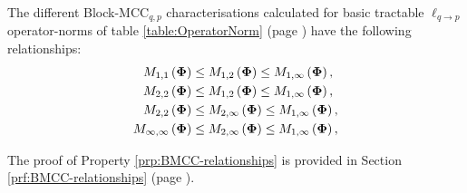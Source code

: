 \begin{property}
\label{prp:BMCC-relationships}
The different Block-MCC$_{q,p}$ characterisations calculated for basic tractable $\ell_{q {\to} p}$ operator-norms of table \ref{table:OperatorNorm} (page \pageref{table:OperatorNorm}) have the following relationships:
\begin{equation*}
\begin{aligned}
M_{1,1}\left( \boldsymbol{\Phi} \right) &\leq M_{1,2}\left( \boldsymbol{\Phi} \right) \leq M_{1,\infty}\left( \boldsymbol{\Phi} \right), \\
M_{2,2}\left( \boldsymbol{\Phi} \right) &\leq M_{1,2}\left( \boldsymbol{\Phi} \right) \leq M_{1,\infty}\left( \boldsymbol{\Phi} \right), \\
M_{2,2}\left( \boldsymbol{\Phi} \right) &\leq M_{2,\infty}\left( \boldsymbol{\Phi} \right) \leq M_{1,\infty}\left( \boldsymbol{\Phi} \right), \\
M_{\infty,\infty}\left( \boldsymbol{\Phi} \right) &\leq M_{2,\infty}\left( \boldsymbol{\Phi} \right) \leq M_{1,\infty}\left( \boldsymbol{\Phi} \right),
\end{aligned}
\end{equation*}

\end{property}
The proof of Property \ref{prp:BMCC-relationships} is provided in Section \ref{prf:BMCC-relationships} (page \pageref{prf:BMCC-relationships}).